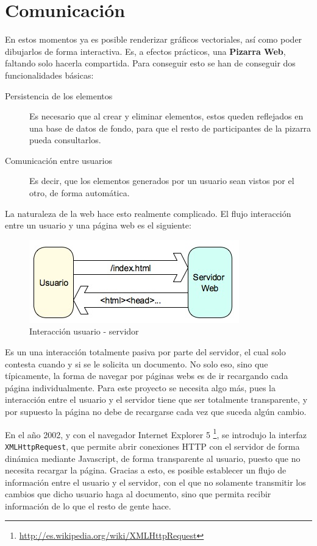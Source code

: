\section{Comunicación} %
\label{sec:javascript_comunicacion}
En estos momentos ya es posible renderizar gráficos vectoriales, así como poder dibujarlos de forma interactiva. Es, a efectos prácticos, una \textbf{Pizarra Web}, faltando solo hacerla compartida. Para conseguir esto se han de conseguir dos funcionalidades básicas:

\begin{description}
  \item[Persistencia de los elementos] Es necesario que al crear y eliminar elementos, estos queden reflejados en una base de datos de fondo, para que el resto de participantes de la pizarra pueda consultarlos.
  \item[Comunicación entre usuarios] Es decir, que los elementos generados por un usuario sean vistos por el otro, de forma automática.
\end{description}

La naturaleza de la web hace esto realmente complicado. El flujo interacción entre un usuario y una página web es el siguiente:

\begin{figure}[h!]
\centering
\includegraphics{navigation.png}
\caption{Interacción usuario - servidor}\label{fig:navigation}
\end{figure}

Es un una interacción totalmente pasiva por parte del servidor, el cual solo contesta cuando y si se le solicita un documento. No solo eso, sino que típicamente, la forma de navegar por páginas webs es de ir recargando cada página individualmente. Para este proyecto se necesita algo más, pues la interacción entre el usuario y el servidor tiene que ser totalmente transparente, y por supuesto la página no debe de recargarse cada vez que suceda algún cambio.

En el año 2002, y con el navegador Internet Explorer 5 \footnote{\url{http://es.wikipedia.org/wiki/XMLHttpRequest}}, se introdujo la interfaz \texttt{XMLHttpRequest}, que permite abrir conexiones  HTTP con el servidor de forma dinámica mediante Javascript, de forma transparente al usuario, puesto que no necesita recargar la página. Gracias a esto, es posible establecer un flujo de información entre el usuario y el servidor, con el que no solamente transmitir los cambios que dicho usuario haga al documento, sino que permita recibir información de lo que el resto de gente hace.


